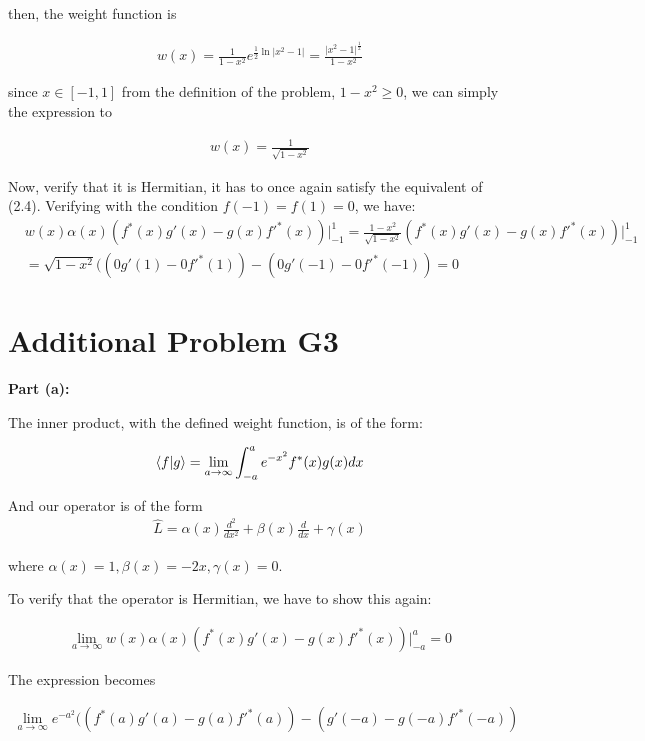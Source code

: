 \documentclass{article}
\numberwithin{equation}{section}
\begin{document}
then, the weight function is 

\begin{align}
    w(x) = \frac{1}{1-x^2} e^{\frac{1}{2}\ln \vert x^2 - 1 \vert } = \frac{\vert x^2-1 \vert^\frac{1}{2}}{1-x^2} 
\end{align}

since $x \in [-1,1]$ from the definition of the problem, $1-x^2 \geq 0$, we can simply the expression to 

\begin{align}
    w(x) = \frac{1}{\sqrt{1-x^2}}
\end{align}

Now, verify that it is Hermitian, it has to once again satisfy the equivalent of (2.4). Verifying with the condition $f(-1) = f(1) = 0$, we have:
\begin{align}
    &w(x) \alpha(x) (f^*(x) g'(x) - g(x) f'^*(x)) \vert^{1}_{-1} = \frac{1-x^2}{\sqrt{1-x^2}} (f^*(x) g'(x) - g(x) f'^*(x)) \vert^{1}_{-1} \\ &= \sqrt{1-x^2} ((0 g'(1) - 0 f'^*(1))-(0 g'(-1) - 0 f'^*(-1)) = 0
\end{align}

\section{Additional Problem G3}

\textbf{Part (a):}

The inner product, with the defined weight function, is of the form: 

\begin{align}
    \bra{f} \ket{g} = \lim_{a\to \infty} \int_{-a}^{a} e^{-x^2} f^*(x) g(x) dx
\end{align}

And our operator is of the form 
\begin{align}
    \hat{L} = \alpha(x) \frac{d^2}{dx^2} + \beta(x) \frac{d}{dx} + \gamma(x) 
\end{align}

where $\alpha(x) = 1, \beta (x) = -2x, \gamma(x) = 0$.

To verify that the operator is Hermitian, we have to show this again: 

\begin{align}
   \lim_{a \to \infty} w(x) \alpha(x) (f^*(x) g'(x) - g(x) f'^*(x)) \vert^{a}_{-a} = 0
\end{align}

The expression becomes

\begin{align}
    \lim_{a \to \infty} e^{-a^2} ((f^*(a) g'(a) - g(a) f'^*(a))-(g'(-a) - g(-a) f'^*(-a)) 
\end{align}
\end{document}
